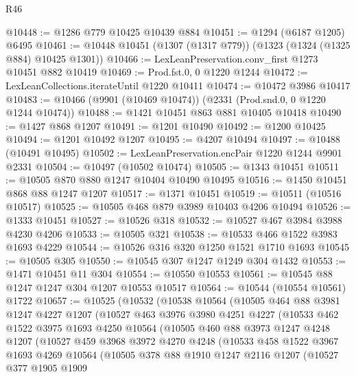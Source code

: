 \begin{lexlean}{R46}
\begin{coremodule}
@10448 := @1286 @779 @10425 @10439 @884
@10451 := @1294 (@6187 @1205) @6495
@10461 := @10448 @10451 (@1307 (@1317 @779)) (@1323 (@1324 (@1325 @884) @10425 @1301))
@10466 := LexLeanPreservation.conv_first @1273 @10451 @882 @10419
@10469 := Prod.fst.{0, 0} @1220 @1244
@10472 := LexLeanCollections.iterateUntil @1220 @10411
@10474 := @10472 @3986 @10417
@10483 := @10466 (@9901 (@10469 @10474)) (@2331 (Prod.snd.{0, 0} @1220 @1244 @10474))
@10488 := @1421 @10451 @863 @881 @10405 @10418
@10490 := @1427 @868 @1207
@10491 := @1201 @10490
@10492 := @1200 @10425
@10494 := @1201 @10492 @1207
@10495 := @4207 @10494
@10497 := @10488 (@10491 @10495)
@10502 := LexLeanPreservation.encPair @1220 @1244 @9901 @2331
@10504 := @10497 (@10502 @10474)
@10505 := @1343 @10451
@10511 := @10505 @870 @880 @1247 @10404 @10490 @10495
@10516 := @1450 @10451 @868 @88 @1247 @1207
@10517 := @1371 @10451
@10519 := @10511 (@10516 @10517)
@10525 := @10505 @468 @879 @3989 @10403 @4206 @10494
@10526 := @1333 @10451
@10527 := @10526 @318
@10532 := @10527 @467 @3984 @3988 @4230 @4206
@10533 := @10505 @321
@10538 := @10533 @466 @1522 @3983 @1693 @4229
@10544 := @10526 @316 @320 @1250 @1521 @1710 @1693
@10545 := @10505 @305
@10550 := @10545 @307 @1247 @1249 @304 @1432
@10553 := @1471 @10451 @11 @304
@10554 := @10550 @10553
@10561 := @10545 @88 @1247 @1247 @304 @1207 @10553 @10517
@10564 := @10544 (@10554 @10561) @1722
@10657 := @10525
    (@10532
      (@10538
        @10564
        (@10505
          @464
          @88
          @3981
          @1247
          @4227
          @1207
          (@10527
            @463
            @3976
            @3980
            @4251
            @4227
            (@10533
              @462
              @1522
              @3975
              @1693
              @4250
              @10564
              (@10505
                @460
                @88
                @3973
                @1247
                @4248
                @1207
                (@10527
                  @459
                  @3968
                  @3972
                  @4270
                  @4248
                  (@10533
                    @458
                    @1522
                    @3967
                    @1693
                    @4269
                    @10564
                    (@10505
                      @378
                      @88
                      @1910
                      @1247
                      @2116
                      @1207
                      (@10527
                        @377
                        @1905
                        @1909

\end{coremodule}
\end{lexlean}
